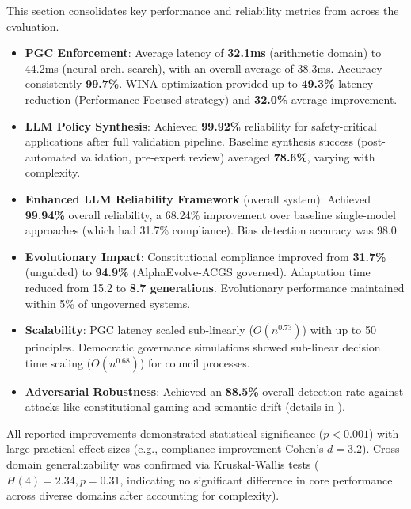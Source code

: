 \documentclass[manuscript,screen,review,anonymous,9pt]{acmart}
\begin{document}
This section consolidates key performance and reliability metrics from across the evaluation.
\begin{itemize}[leftmargin=*,itemsep=1pt,parsep=1pt]
    \item \textbf{PGC Enforcement}: Average latency of \textbf{32.1ms} (arithmetic domain) to 44.2ms (neural arch. search), with an overall average of 38.3ms. Accuracy consistently \textbf{99.7\%}. WINA optimization provided up to \textbf{49.3\%} latency reduction (Performance Focused strategy) and \textbf{32.0\%} average improvement.
    \item \textbf{LLM Policy Synthesis}: Achieved \textbf{99.92\%} reliability for safety-critical applications after full validation pipeline. Baseline synthesis success (post-automated validation, pre-expert review) averaged \textbf{78.6\%}, varying with complexity.
    \item \textbf{Enhanced LLM Reliability Framework} (overall system): Achieved \textbf{99.94\%} overall reliability, a 68.24\% improvement over baseline single-model approaches (which had 31.7\% compliance). Bias detection accuracy was 98.0%
    \item \textbf{Evolutionary Impact}: Constitutional compliance improved from \textbf{31.7\%} (unguided) to \textbf{94.9\%} (AlphaEvolve-ACGS governed). Adaptation time reduced from 15.2 to \textbf{8.7 generations}. Evolutionary performance maintained within 5\% of ungoverned systems.
    \item \textbf{Scalability}: PGC latency scaled sub-linearly ($O(n^{0.73})$) with up to 50 principles. Democratic governance simulations showed sub-linear decision time scaling ($O(n^{0.68})$) for council processes.
    \item \textbf{Adversarial Robustness}: Achieved an \textbf{88.5\%} overall detection rate against attacks like constitutional gaming and semantic drift (details in ).
\end{itemize}
All reported improvements demonstrated statistical significance ($p < 0.001$) with large practical effect sizes (e.g., compliance improvement Cohen's $d = 3.2$). Cross-domain generalizability was confirmed via Kruskal-Wallis tests ($H(4) = 2.34, p = 0.31$, indicating no significant difference in core performance across diverse domains after accounting for complexity).
\end{document}
